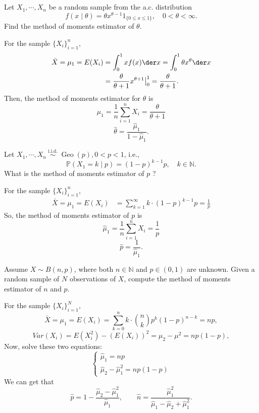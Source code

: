 \chapter{}

\begin{ex}
	Let \(X_{1}, \cdots, X_{n}\) be a random sample from the a.c. distribution
	\[
	f(x \mid \theta)=\theta x^{\theta-1} 1_{\{0 \leqslant x \leqslant 1\}}, \quad 0<\theta<\infty .
	\]
	Find the method of moments estimator of \(\theta\).
\end{ex}

\begin{solution}
	For the sample \(\{X_i\}_{i=1}^n\),
	\[
		\begin{aligned}
			\bar{X}=\mu_1=E(X_i)&=\int_0^1xf(x)\der x=\int_0^1\theta x^\theta\der x\\
			&=\frac{\theta}{\theta+1}x^{\theta+1}\big|_0^1=\frac{\theta}{\theta+1}.
		\end{aligned}
	\]
	Then, the method of moments estimator for $\theta$ is
	\[
		\hat{\mu}_1=\frac{1}{n}\sum_{i=1}^nX_i=\frac{\theta}{\theta+1}
	\]
	\[
		\hat{\theta}=\frac{\hat{\mu}_1}{1-\hat{\mu}_1}.
	\]
\end{solution}

\begin{ex}
	Let \(X_{1}, \cdots, X_{n} \stackrel{\text { i.i.d. }}{\sim} \operatorname{Geo}(p), 0<p<1\), i.e.,
	\[
	\mathbb{P}\left(X_{1}=k \mid p\right)=(1-p)^{k-1} p, \quad k \in \mathbb{N} .
	\]
	What is the method of moments estimator of \(p\) ?
\end{ex}

\begin{solution}
	For the sample \(\{X_i\}_{i=1}^n\),
	\[
		\begin{aligned}
			\bar{X}=\mu_1=E(X_i)&=\sum_{k=1}^\infty k\cdot (1-p)^{k-1}p=\frac{1}{p}
		\end{aligned}
	\]
	So, the method of moments estimator of $p$ is
	\[
		\hat{\mu}_1=\frac{1}{n}\sum_{i=1}^nX_i=\frac{1}{p}
	\]
	\[
		\hat{p}=\frac{1}{\hat{\mu}_1}.
	\]
\end{solution}

\begin{ex}
	Assume \(X \sim B(n, p)\), where both \(n \in \mathbb{N}\) and \(p \in(0,1)\) are unknown. Given a random sample of \(N\) observations of \(X\), compute the method of moments estimator of \(n\) and \(p\).
\end{ex}

\begin{solution}
	For the sample \(\{X_i\}_{i=1}^N\),
	\[
		\bar{X}=\mu_1=E(X_i)=\sum_{k=0}^nk\cdot \binom{n}{k}p^k(1-p)^{n-k}=np,
	\]
	\[
		Var(X_i)=E(X_i^2)-(E(X_i))^2=\mu_2-\mu^2=np(1-p),
	\]
	Now, solve these two equations:
	\[
		\left\{\begin{array}{l}
			\hat{\mu}_1=np\\
			\hat{\mu}_2-\hat{\mu}_1^2=np(1-p)
		\end{array}\right.
	\]
	We can get that
	\[
		\hat{p}=1-\frac{\hat{\mu}_2-\hat{\mu}_1^2}{\hat{\mu}_1},\qquad\hat{n}=\frac{\hat{\mu}_1^2}{\hat{\mu}_1-\hat{\mu}_2+\hat{\mu}_1^2}.
	\]
\end{solution}

